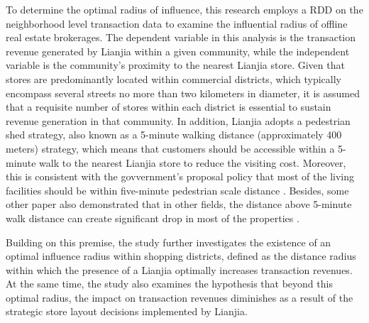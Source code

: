 \documentclass[11pt]{article}
\begin{document}
To determine the optimal radius of influence, this research employs a RDD on the neighborhood level transaction data to examine the influential radius of offline real estate brokerages. The dependent variable in this analysis is the transaction revenue generated by Lianjia within a given community, while the independent variable is the community's proximity to the nearest Lianjia store. Given that stores are predominantly located within commercial districts, which typically encompass several streets no more than two kilometers in diameter, it is assumed that a requisite number of stores within each district is essential to sustain revenue generation in that community. In addition, Lianjia adopts a pedestrian shed strategy, also known as a 5-minute walking distance (approximately 400 meters) strategy, which means that customers should be accessible within a 5-minute walk to the nearest Lianjia store to reduce the visiting cost. Moreover, this is consistent with the govvernment's proposal policy that most of the living facilities should be within five-minute pedestrian scale distance \citep{GB50180-2018}. Besides, some other paper also demonstrated that in other fields, the distance above 5-minute walk distance can create significant drop in most of the properties \citep{liu2023chrono-urbanism}.

Building on this premise, the study further investigates the existence of an optimal influence radius within shopping districts, defined as the distance radius within which the presence of a Lianjia optimally increases transaction revenues. At the same time, the study also examines the hypothesis that beyond this optimal radius, the impact on transaction revenues diminishes as a result of the strategic store layout decisions implemented by Lianjia.
\end{document}
